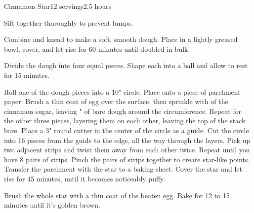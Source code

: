 \documentclass[../Cookbook.tex]{subfiles}
\begin{document}
\begin{recipe}[CinnamonStar]{Cinnamon Star}{12 servings}{2.5 hours}

Sift together thoroughly to prevent lumps.

Combine and knead to make a soft, smooth dough.
Place in a lightly greased bowl, cover, and let rise for 60 minutes until doubled in bulk.

Divide the dough into four equal pieces.
Shape each into a ball and allow to rest for 15 minutes.

Roll one of the dough pieces into a 10" circle.
Place onto a piece of parchment paper.
Brush a thin coat of egg over the surface, then sprinkle with  of the cinnamon sugar, leaving " of bare dough around the circumference.
Repeat for the other three pieces, layering them on each other, leaving the top of the stack bare.
Place a 3" round cutter in the center of the circle as a guide.
Cut the circle into 16 pieces from the guide to the edge, all the way through the layers.
Pick up two adjacent strips and twist them away from each other twice.
Repeat until you have 8 pairs of strips.
Pinch the pairs of strips together to create star-like points.
Transfer the parchment with the star to a baking sheet.
Cover the star and let rise for 45 minutes, until it becomes noticeably puffy.

Brush the whole star with a thin coat of the beaten egg.
Bake for 12 to 15 minutes until it's golden brown.

\end{recipe}
\end{document}
